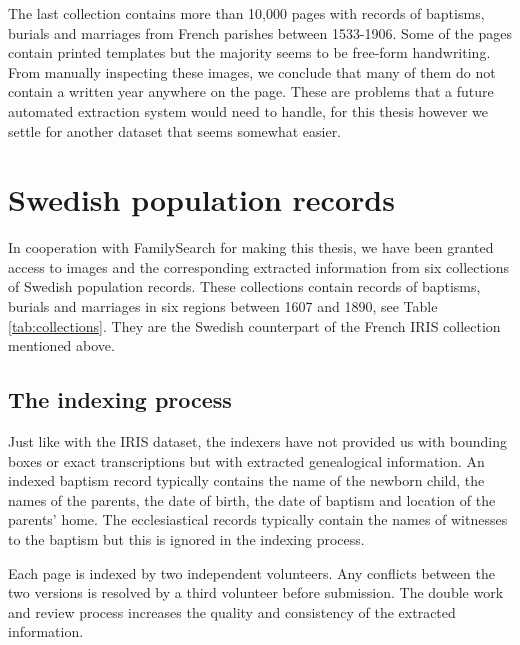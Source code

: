 The last collection contains more than 10,000 pages with records of baptisms, burials and marriages from French parishes between 1533-1906. Some of the pages contain printed templates but the majority seems to be free-form handwriting.
From manually inspecting these images, we conclude that many of them do not contain a written year anywhere on the page. These are problems that a future automated extraction system would need to handle, for this thesis however we settle for another dataset that seems somewhat easier.


\section{Swedish population records}



In cooperation with FamilySearch for making this thesis, we have been granted access to images and the corresponding extracted information from six collections of Swedish population records.
These collections contain records of baptisms, burials and marriages in six regions between 1607 and 1890, see Table \ref{tab:collections}. They are the Swedish counterpart of the French IRIS collection mentioned above.



\subsection{The indexing process}

Just like with the IRIS dataset, the indexers have not provided us with bounding boxes or exact transcriptions but with extracted genealogical information. An indexed baptism record typically contains the name of the newborn child, the names of the parents, the date of birth, the date of baptism and location of the parents' home. The ecclesiastical records typically contain the names of witnesses to the baptism but this is ignored in the indexing process.

Each page is indexed by two independent volunteers. Any conflicts between the two versions is resolved by a third volunteer before submission.
The double work and review process increases the quality and consistency of the extracted information.

